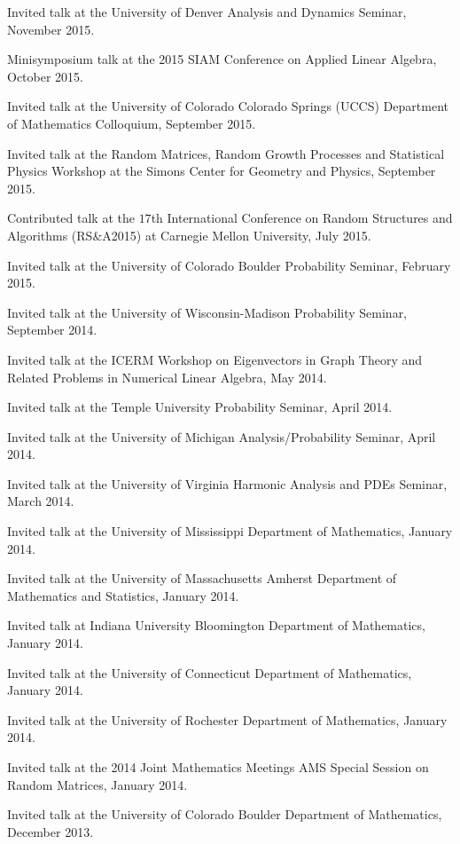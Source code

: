 \documentclass[letterpaper]{article}
\renewenvironment{itemize}{
  \begin{list}{}{
    \setlength{\leftmargin}{1em}
  }
}{
  \end{list}
}
\begin{document}
\begin{itemize}
	\item Invited talk at the University of Denver Analysis and Dynamics Seminar, November 2015.  
	\item Minisymposium talk at the 2015 SIAM Conference on Applied Linear Algebra, October 2015.  
	\item Invited talk at the University of Colorado Colorado Springs (UCCS) Department of Mathematics Colloquium, September 2015.
	\item Invited talk at the Random Matrices, Random Growth Processes and Statistical Physics Workshop at the Simons Center for Geometry and Physics, September 2015.
	\item Contributed talk at the $17$th International Conference on Random Structures and Algorithms (RS\&A2015) at Carnegie Mellon University, July 2015.
	\item Invited talk at the University of Colorado Boulder Probability Seminar, February 2015.  
	\item Invited talk at the University of Wisconsin-Madison Probability Seminar, September 2014.  
	\item Invited talk at the ICERM Workshop on Eigenvectors in Graph Theory and Related Problems in Numerical Linear Algebra, May 2014.
	\item Invited talk at the Temple University Probability Seminar, April 2014.  
	\item Invited talk at the University of Michigan Analysis/Probability Seminar, April 2014.
	\item Invited talk at the University of Virginia Harmonic Analysis and PDEs Seminar, March 2014.	
	\item Invited talk at the University of Mississippi Department of Mathematics, January 2014.
	\item Invited talk at the University of Massachusetts Amherst Department of Mathematics and Statistics, January 2014.
	\item Invited talk at Indiana University Bloomington Department of Mathematics, January 2014.
	\item Invited talk at the University of Connecticut Department of Mathematics, January 2014.
	\item Invited talk at the University of Rochester Department of Mathematics, January 2014.
	\item Invited talk at the 2014 Joint Mathematics Meetings AMS Special Session on Random Matrices, January 2014.
	\item Invited talk at the University of Colorado Boulder Department of Mathematics, December 2013.

\end{itemize}
\end{document}
